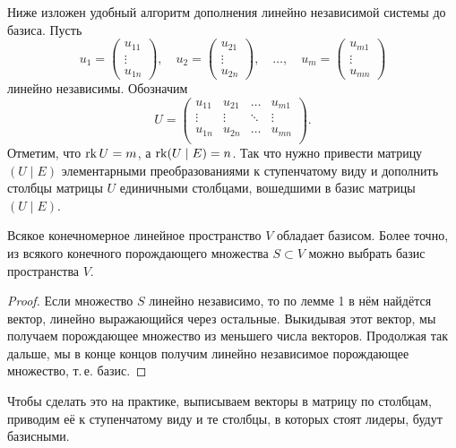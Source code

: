 \begin{remark}
    Ниже изложен удобный алгоритм дополнения линейно независимой системы до базиса. Пусть 
    \[
        u_1 = 
        \begin{pmatrix}
            u_{11}\\
            \vdots\\
            u_{1n}
        \end{pmatrix},\quad
        u_2 = 
        \begin{pmatrix}
            u_{21}\\
            \vdots\\
            u_{2n}
        \end{pmatrix},\quad\ldots,\quad
        u_m = 
        \begin{pmatrix}
            u_{m1}\\
            \vdots\\
            u_{mn}
        \end{pmatrix}
    \] линейно независимы. Обозначим
    \[
        U = 
        \begin{pmatrix}
            u_{11} & u_{21} & \ldots & u_{m1}\\
            \vdots & \vdots & \ddots & \vdots\\
            u_{1n} & u_{2n} & \ldots & u_{mn}\\
        \end{pmatrix}.
    \]
    Отметим, что $\operatorname{rk} U = m$, а $\operatorname{rk}(U \mid E) = n$. Так что нужно привести матрицу $(U \mid E)$ элементарными преобразованиями к ступенчатому виду и дополнить столбцы матрицы $U$ единичными столбцами, вошедшими в базис матрицы $(U \mid E)$.
\end{remark}

\begin{lemma}
    Всякое конечномерное линейное пространство $V$ обладает базисом. Более точно, из всякого конечного порождающего множества $S \subset V$ можно выбрать базис пространства $V$.
\end{lemma}

\begin{proof}
    Если множество $S$ линейно независимо, то по лемме 1 в нём найдётся вектор, линейно выражающийся через остальные. Выкидывая этот вектор, мы получаем порождающее множество из меньшего числа векторов. Продолжая так дальше, мы в конце концов получим линейно независимое порождающее множество, т.\,е. базис.
\end{proof}

\begin{remark}
    Чтобы сделать это на практике, выписываем векторы в матрицу по столбцам, приводим её к ступенчатому виду и те столбцы, в которых стоят лидеры, будут базисными.
\end{remark}

